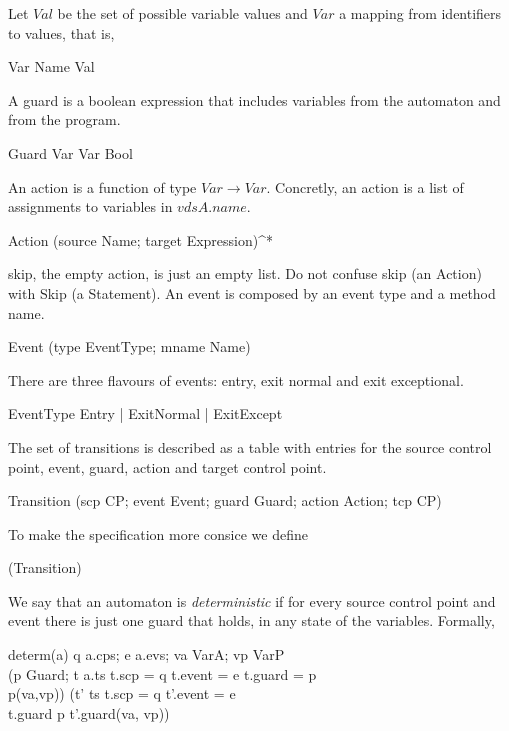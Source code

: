 \documentclass[a4paper,10pt]{article}
\begin{document}
Let $Val$ be the set of possible variable values and $Var$ a mapping from identifiers to values, that is,
\begin{haskell}
Var \eqdef Name \to Val
\end{haskell}

A guard is a boolean expression that includes variables from the automaton and from the program.
\begin{haskell}
Guard \eqdef Var \times Var \to Bool
\end{haskell}

An action is a function of type $Var \to Var$. Concretly, an action is a list of assignments to variables
in $vdsA.name$.
\begin{haskell}
Action \eqdef (source \colon Name; target \colon Expression)^*\\
\end{haskell}

\<skip\>, the empty action, is just an empty list. Do not confuse \<skip\> (an \<Action\>) with \<Skip\> (a
\<Statement\>).
An event is composed by an event type and a method name.
\begin{haskell}
Event \eqdef (type \colon EventType; mname \colon Name)
\end{haskell}

There are three flavours of events: entry, exit normal and exit exceptional.
\begin{haskell}
EventType \eqdef Entry | ExitNormal | ExitExcept
\end{haskell}

The set of transitions is described as a table with entries for the source control point, event, guard, action
and target control point.
\begin{haskell}
Transition \eqdef (scp \dcolon CP; event \dcolon Event; guard \dcolon Guard; action \dcolon Action; tcp
\dcolon CP)
\end{haskell}

To make the specification more consice we define
\begin{haskell}
  \Transitions \eqdef \powerset(Transition)
\end{haskell}

We say that an automaton is \emph{deterministic} if for every source control point and event there is just one
guard that holds, in any state of the variables. Formally,
\begin{haskell}\label{def:MVADeterm}
determ(a) \eqdef \forall q \in a.cps; e \in a.evs; va \in VarA; vp \in VarP \cdot\\
 \quad\quad (\exists p \in Guard; t \in a.ts \cdot t.scp = q \wedge t.event = e \wedge t.guard = p \wedge\\
 \quad\quad p(va,vp)) \Longrightarrow (\forall t' \in ts \cdot t.scp = q \wedge t'.event = e \wedge\\
 \quad\quad t.guard \neq p \Longrightarrow \neg t'.guard(va, vp))\\
\end{haskell}
\end{document}
